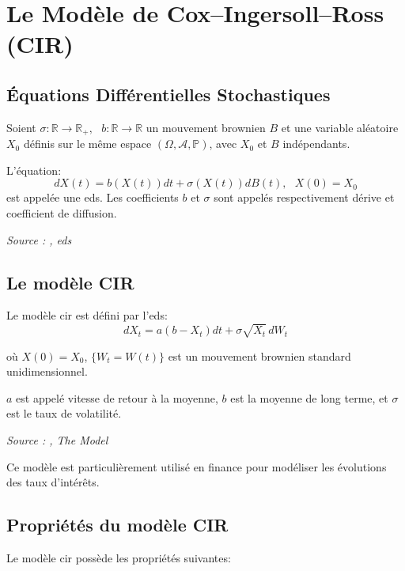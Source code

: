 \section{Le Modèle de Cox--Ingersoll--Ross (CIR)}


\subsection{Équations Différentielles Stochastiques}

\begin{definition}\label{def:eds}
Soient $\sigma: \mathbb{R} \rightarrow \mathbb{R}_+, \text{ } b:\mathbb{R} \rightarrow \mathbb{R}$ un mouvement brownien $B$ et une variable aléatoire $X_0$ définis sur le même espace $(\Omega, \mathcal{A}, \mathbb{P})$, avec $X_0$ et $B$ indépendants.

L'équation:
$$dX(t) = b(X(t))dt + \sigma(X(t))dB(t), \text{ }X(0) = X_0$$
est appelée une \gls{eds}.
Les coefficients $b$ et $\sigma$ sont appelés respectivement dérive et coefficient de diffusion.

\noindent\textit{Source : \cite{calcul_stochastique_diffusion},  \gls{eds}}
\end{definition}


\subsection{Le modèle CIR}

\begin{definition}\label{def:cir_modele}
Le modèle \gls{cir} est défini par l'\gls{eds}:
$$dX_t = a(b - X_t)dt + \sigma\sqrt{X_t}\,dW_t$$

où $X(0) = X_0$, $\{W_t = W(t)\}$ est un mouvement brownien standard unidimensionnel.

$a$ est appelé vitesse de retour à la moyenne, $b$ est la moyenne de long terme, et $\sigma$ est le taux de volatilité.

\noindent\textit{Source : \cite{cir_modeling},  The  Model}

Ce modèle est particulièrement utilisé en finance pour modéliser les évolutions des taux d'intérêts.
\end{definition}


\subsection{Propriétés du modèle CIR}

Le modèle \gls{cir} possède les propriétés suivantes:

